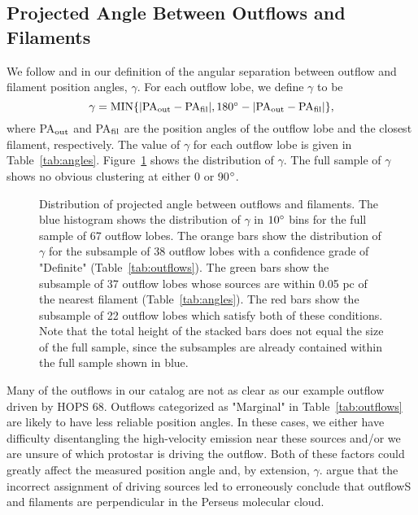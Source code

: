 \documentclass[twocolumn]{aastex63}
\newcommand{\nlobes}{67}
\newcommand{\example}{HOPS 68}
\begin{document}
\subsection{Projected Angle Between Outflows and Filaments}\label{sec:gamma}

We follow \citet{Stephens17} and \citet{Kong19} in our definition of the angular separation between outflow and filament position angles, $\gamma$. For each outflow lobe, we define $\gamma$ to be 
\begin{equation}
    \gamma = \rm{MIN}\{|\rm{PA}_{\rm out} - \rm{PA}_{\rm fil}|, 180\degr - |\rm{PA}_{\rm out} - \rm{PA}_{\rm fil}|\},
\end{equation}
where PA$_{\rm out}$ and PA$_{\rm fil}$ are the position angles of the outflow lobe and the closest filament, respectively. The value of $\gamma$ for each outflow lobe is given in Table~\ref{tab:angles}. Figure~\ref{fig:gamma_hist} shows the distribution of $\gamma$. The full sample of $\gamma$ shows no obvious clustering at either 0 or 90$\mbox{$^\circ$}$.

\begin{figure}
\caption{Distribution of projected angle between outflows and filaments. The blue histogram shows the distribution of $\gamma$ in $10\mbox{$^\circ$}$ bins for the full sample of \nlobes{} outflow lobes. The orange bars show the distribution of $\gamma$ for the subsample of 38 outflow lobes with a confidence grade of "Definite" (Table~\ref{tab:outflows}). The green bars show the subsample of 37 outflow lobes whose sources are within 0.05 pc of the nearest filament (Table~\ref{tab:angles}). The red bars show the subsample of 22 outflow lobes which satisfy both of these conditions. Note that the total height of the stacked bars does not equal the size of the full sample, since the subsamples are already contained within the full sample shown in blue. \label{fig:gamma_hist}}
\end{figure}

Many of the outflows in our catalog are not as clear as our example outflow driven by \example{}. Outflows categorized as "Marginal" in Table~\ref{tab:outflows} are likely to have less reliable position angles. In these cases, we either have difficulty disentangling the high-velocity emission near these sources and/or we are unsure of which protostar is driving the outflow. Both of these factors could greatly affect the measured position angle and, by extension, $\gamma$. \citet{Stephens17} argue that the incorrect assignment of driving sources led \citet{Anathpindika08} to erroneously conclude that outflowS and filaments are perpendicular in the Perseus molecular cloud.
\end{document}

